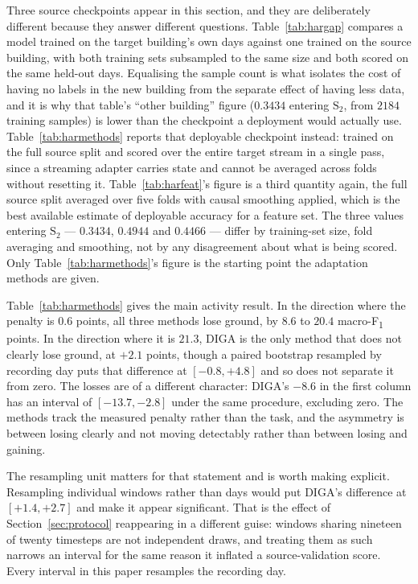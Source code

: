 \documentclass[a4paper,fleqn]{cas-dc}
\newcommand{\macf}{macro-F\textsubscript{1}}
\begin{document}
Three source checkpoints appear in this section, and they are deliberately different
because they answer different questions. Table~\ref{tab:hargap} compares a model trained on
the target building's own days against one trained on the source building, with both
training sets subsampled to the same size and both scored on the same held-out days.
Equalising the sample count is what isolates the cost of having no labels in the new
building from the separate effect of having less data, and it is why that table's
``other building'' figure ($0.3434$ entering $\text{S}_2$, from $2184$ training samples) is
lower than the checkpoint a deployment would actually use. Table~\ref{tab:harmethods}
reports that deployable checkpoint instead: trained on the full source split and scored over
the entire target stream in a single pass, since a streaming adapter carries state and
cannot be averaged across folds without resetting it. Table~\ref{tab:harfeat}'s figure is a
third quantity again, the full source split averaged over five folds with causal smoothing
applied, which is the best available estimate of deployable accuracy for a feature set. The
three values entering $\text{S}_2$ --- $0.3434$, $0.4944$ and $0.4466$ --- differ by
training-set size, fold averaging and smoothing, not by any disagreement about what is being
scored. Only Table~\ref{tab:harmethods}'s figure is the starting point the adaptation
methods are given.

Table~\ref{tab:harmethods} gives the main activity result. In the direction where the
penalty is $0.6$ points, all three methods lose ground, by $8.6$ to $20.4$ \macf{} points.
In the direction where it is $21.3$, DIGA is the only method that does not clearly lose
ground, at $+2.1$ points, though a paired bootstrap resampled by recording day puts that
difference at $[-0.8,+4.8]$ and so does not separate it from zero. The losses are of a
different character: DIGA's $-8.6$ in the first column has an interval of $[-13.7,-2.8]$
under the same procedure, excluding zero. The methods track the measured penalty rather
than the task, and the asymmetry is between losing clearly and not moving detectably
rather than between losing and gaining.

The resampling unit matters for that statement and is worth making explicit. Resampling
individual windows rather than days would put DIGA's difference at $[+1.4,+2.7]$ and make
it appear significant. That is the effect of Section~\ref{sec:protocol} reappearing in a
different guise: windows sharing nineteen of twenty timesteps are not independent draws,
and treating them as such narrows an interval for the same reason it inflated a
source-validation score. Every interval in this paper resamples the recording day.
\end{document}
